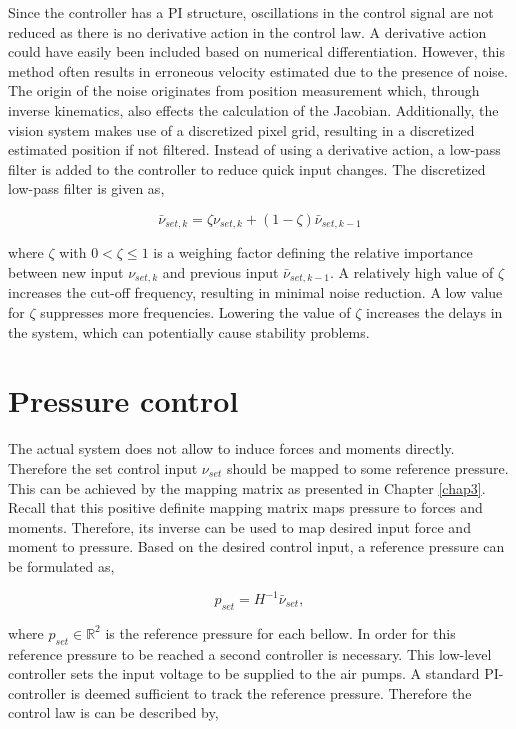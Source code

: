 Since the controller has a PI structure, oscillations in the control signal are not reduced as there is no derivative action in the control law. A derivative action could have easily been included based on numerical differentiation. However, this method often results in erroneous velocity estimated due to the presence of noise. The origin of the noise originates from position measurement which, through inverse kinematics, also effects the calculation of the Jacobian. Additionally, the vision system makes use of a discretized pixel grid, resulting in a discretized estimated position if not filtered. Instead of using a derivative action, a low-pass filter is added to the controller to reduce quick input changes. The discretized low-pass filter is given as,

\begin{equation}
\bar{\nu}_{set,k} = \zeta \nu_{set,k} + (1-\zeta)\bar{\nu}_{set,k-1}
\label{eq4:lowpass}
\end{equation}

where $\zeta$ with $ 0 < \zeta \leq 1$ is a weighing factor defining the relative importance between new input $\nu_{set,k}$ and previous input $\bar{\nu}_{set,k-1}$. A relatively high value of $\zeta$ increases the cut-off frequency, resulting in minimal noise reduction. A low value for $\zeta$ suppresses more frequencies. Lowering the value of $\zeta$ increases the delays in the system, which can potentially cause stability problems. 


\section{Pressure control}


The actual system does not allow to induce forces and moments directly. Therefore the set control input $\nu_{set}$ should be mapped to some reference pressure. This can be achieved by the mapping matrix as presented in Chapter \ref{chap3}. Recall that this positive definite mapping matrix maps pressure to forces and moments. Therefore, its inverse can be used to map desired input force and moment to pressure. Based on the desired control input, a reference pressure can be formulated as,

\begin{equation}
    p_{set} = H^{-1}\bar{\nu}_{set},
\end{equation}


where $p_{set} \in \mathbb{R}^2$ is the reference pressure for each bellow. In order for this reference pressure to be reached a second controller is necessary. This low-level controller sets the input voltage to be supplied to the air pumps. A standard PI-controller is deemed sufficient to track the reference pressure. Therefore the control law is can be described by,

